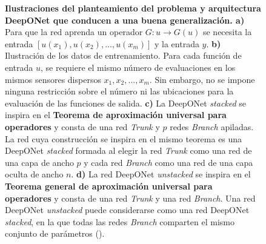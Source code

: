 \documentclass[
  spanish,
  us-letterpaper,
  DIV=11,
  numbers=noendperiod]{scrreprt}
\theoremstyle{plain}
\theoremstyle{definition}
\theoremstyle{remark}
\begin{document}
\begin{figure}


\caption{\label{fig-deeponet-arch}\textbf{Ilustraciones del
planteamiento del problema y arquitectura DeepONet que conducen a una
buena generalización. a)} Para que la red aprenda un operador
\(G : u \rightarrow G(u)\) se necesita la entrada
\([u(x_1), u(x_2), ..., u(x_m)]\) y la entrada \(y\). \textbf{b)}
Ilustración de los datos de entrenamiento. Para cada función de entrada
\(u\), se requiere el mismo número de evaluaciones en los mismos
sensores dispersos \(x_1, x_2, ..., x_m\). Sin embargo, no se impone
ninguna restricción sobre el número ni las ubicaciones para la
evaluación de las funciones de salida. \textbf{c)} La DeepONet
\emph{stacked} se inspira en el \textbf{Teorema de aproximación
universal para operadores} y consta de una red \emph{Trunk} y \(p\)
redes \emph{Branch} apiladas. La red cuya construcción se inspira en el
mismo teorema es una DeepONet \emph{stacked} formada al elegir la red
\emph{Trunk} como una red de una capa de ancho \(p\) y cada red
\emph{Branch} como una red de una capa oculta de ancho \(n\).
\textbf{d)} La red DeepONet \emph{unstacked} se inspira en el
\textbf{Teorema general de aproximación universal para operadores} y
consta de una red \emph{Trunk} y una red \emph{Branch}. Una red DeepONet
\emph{unstacked} puede considerarse como una red DeepONet
\emph{stacked}, en la que todas las redes \emph{Branch} comparten el
mismo conjunto de parámetros ().}

\end{figure}%
\end{document}
